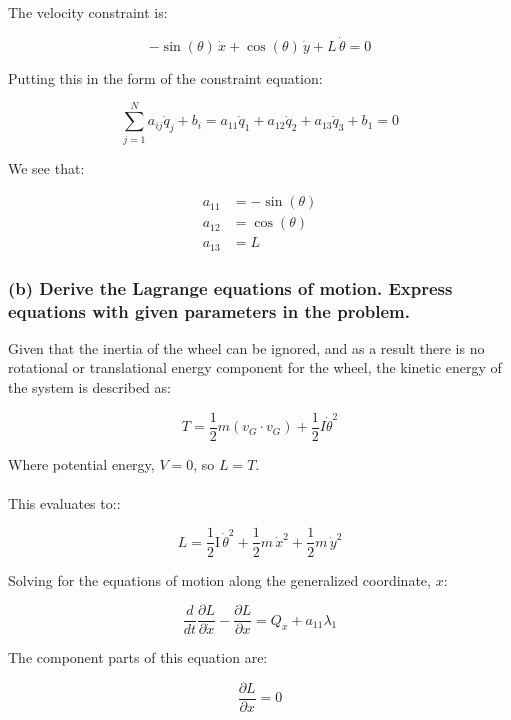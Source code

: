 \documentclass[12pt, letterpaper]{../assignment}
\begin{document}
The velocity constraint is:

\begin{answer}
$$-\sin \left(\theta \right)\,\dot{x} +\cos \left(\theta \right)\,\dot{y}+ L\,\dot{\theta}=0$$
\end{answer}

Putting this in the form of the constraint equation:

$$ \sum_{j=1}^N a_{ij} \dot{q}_j + b_i =
a_{11} \dot{q}_1 + a_{12} \dot{q}_2 + a_{13} \dot{q}_3 + b_1 = 0  $$

We see that:

\begin{answer}
\begin{equation*}
    \begin{aligned}
        a_{11} &= -\sin \left(\theta \right) \\
        a_{12} &= \cos \left(\theta \right) \\
        a_{13} &= L
    \end{aligned}
\end{equation*}
\end{answer}

\subsubsection*{(b) Derive the Lagrange equations of motion.
Express equations with given parameters in the problem.}

Given that the inertia of the wheel can be ignored,
and as a result there is no rotational or translational energy component for the wheel,
the kinetic energy of the system is described as:

$$ T = \frac{1}{2} m \left(v_G \cdot v_G \right) +
       \frac{1}{2} I \dot{\theta}^2 $$

Where potential energy, $V = 0$, so $L = T$.
\\\\
This evaluates to::

$$ L = \frac{1}{2}\textrm{I}\,{{\dot{\theta} }}^2 +\frac{1}{2}m\,{{\dot{x}}}^2 +\frac{1}{2}m\,{{\dot{y}}}^2 $$

Solving for the equations of motion along the generalized coordinate, $x$:

$$ \frac{d}{d t} \frac{\partial L}{\partial \dot{x}} - \frac{\partial L}{\partial x} = 
Q_{x} + a_{11} \lambda_1 $$

The component parts of this equation are:


$$ \frac{\partial L}{\partial x} = 0 $$
\end{document}
